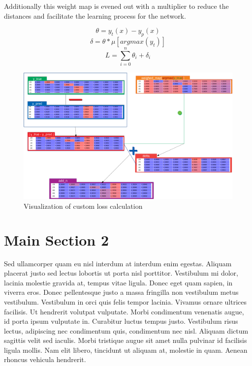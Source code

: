 Additionally this weight map is evened out with a multiplier to reduce the distances and facilitate
the learning process for the network.

$$\theta=y_t(x)-y_p(x)$$
$$\delta=\theta*\mu[argmax(y_t)] $$
$$L=\sum_{i=0}^{n}\theta_i+\delta_i$$


\begin{figure}[H]
    \centering
    \includegraphics[width=\textwidth,height=\textheight,keepaspectratio]{img/loss_calculation.png}
    \decoRule
    \caption[CILoss]{Visualization of custom loss calculation}
    \label{fig:ciloss-calc}
\end{figure}


\section{Main Section 2}

Sed ullamcorper quam eu nisl interdum at interdum enim egestas. Aliquam placerat justo sed lectus lobortis ut porta
nisl porttitor. Vestibulum mi dolor, lacinia molestie gravida at, tempus vitae ligula. Donec eget quam sapien, in
viverra eros. Donec pellentesque justo a massa fringilla non vestibulum metus vestibulum. Vestibulum in orci quis
felis tempor lacinia. Vivamus ornare ultrices facilisis. Ut hendrerit volutpat vulputate. Morbi condimentum venenatis
augue, id porta ipsum vulputate in. Curabitur luctus tempus justo. Vestibulum risus lectus, adipiscing nec
condimentum quis, condimentum nec nisl. Aliquam dictum sagittis velit sed iaculis. Morbi tristique augue sit amet
nulla pulvinar id facilisis ligula mollis. Nam elit libero, tincidunt ut aliquam at, molestie in quam. Aenean rhoncus
vehicula hendrerit.